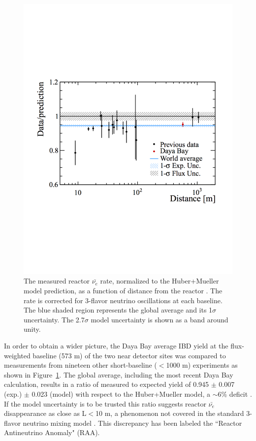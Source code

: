 \begin{figure}[!t]
	\centering
	\includegraphics[width=0.6\linewidth]{tex/3-reactorneutrinos-images/WorldAvgFlux}
	\caption{The measured reactor $\bar{\nu_{e}}$ rate, normalized to the Huber+Mueller model prediction, as a function of distance from the reactor \cite{DayaBayFlux2018}. The rate is corrected for 3-flavor neutrino oscillations at each baseline. The blue shaded region represents the global average and its 1$\sigma$ uncertainty. The 2.7$\sigma$ model uncertainty is shown as a band around unity.}
	\label{fig:worldavgflux}
\end{figure}

In order to obtain a wider picture, the Daya Bay average IBD yield at the flux-weighted baseline (573 m) of the two near detector sites was compared to measurements from nineteen other short-baseline ($<$1000 m) experiments as shown in Figure~\ref{fig:worldavgflux}. 
The global average, including the most recent Daya Bay calculation, results in a ratio of measured to expected yield of 0.945 $\pm$ 0.007 (exp.) $\pm$ 0.023 (model) with respect to the Huber+Mueller model, a $\sim$6\% deficit \cite{DayaBayFlux2018}.
If the model uncertainty is to be trusted this ratio suggests reactor $\bar{\nu_{e}}$ disappearance as close as L$<$10 m, a phenomenon not covered in the standard 3-flavor neutrino mixing model \cite{HayesVogel}.  
This discrepancy has been labeled the ``Reactor Antineutrino Anomaly" (RAA). 

